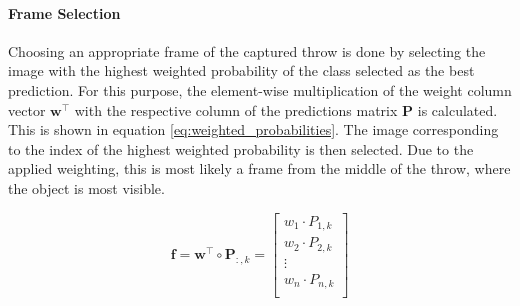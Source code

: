 \paragraph{Frame Selection}
Choosing an appropriate frame of the captured throw is done by selecting the image with the highest weighted probability of the class selected as the best prediction. %
For this purpose, the element-wise multiplication of the weight column vector $\boldsymbol{w}^\top$ with the respective column of the predictions matrix $\boldsymbol{P}$ is calculated.
This is shown in equation \ref{eq:weighted_probabilities}.
The image corresponding to the index of the highest weighted probability is then selected.
Due to the applied weighting, this is most likely a frame from the middle of the throw, where the object is most visible.

\begin{equation}
  \boldsymbol{f} = \boldsymbol{w}^\top \circ \boldsymbol{P}_{:,k} =
  \begin{bmatrix}
    w_{1} \cdot P_{1,k} \\
    w_{2} \cdot P_{2,k} \\
    \vdots \\
    w_{n} \cdot P_{n,k} \\
  \end{bmatrix}
  \label{eq:weighted_probabilities}
\end{equation}


